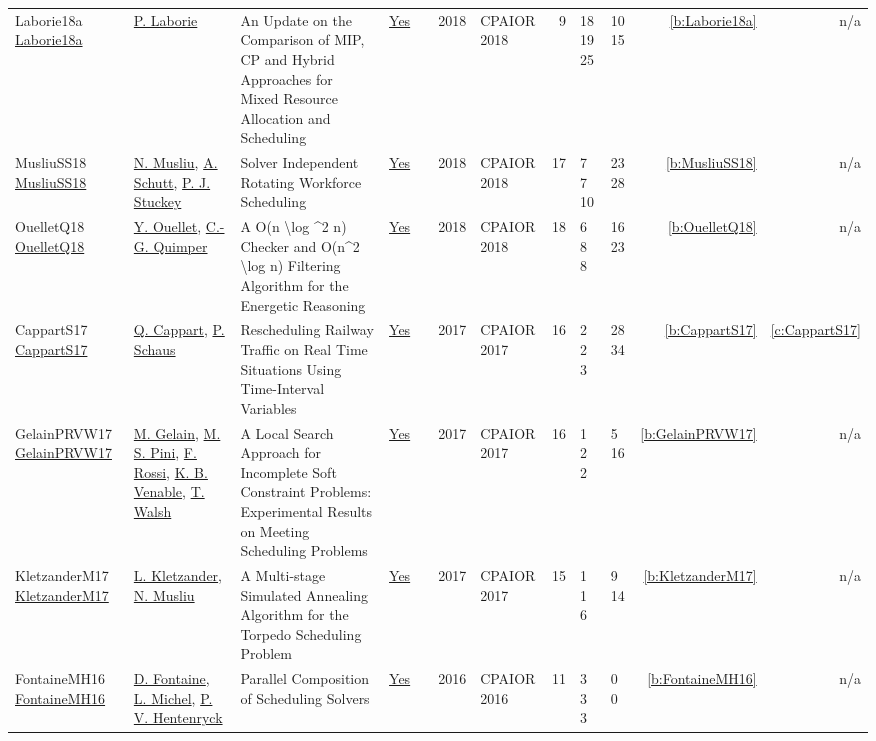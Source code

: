 {\begin{longtable}{>{\raggedright\arraybackslash}p{3cm}>{\raggedright\arraybackslash}p{4.5cm}>{\raggedright\arraybackslash}p{6.0cm}rrrp{2.5cm}rp{1cm}p{1cm}rr}
Laborie18a \href{https://doi.org/10.1007/978-3-319-93031-2_29}{Laborie18a} & \hyperref[auth:a118]{P. Laborie} & An Update on the Comparison of MIP, {CP} and Hybrid Approaches for Mixed Resource Allocation and Scheduling & \href{../works/Laborie18a.pdf}{Yes} & \cite{Laborie18a} & 2018 & CPAIOR 2018 & 9 & 18 19 25 & 10 15 & \ref{b:Laborie18a} & n/a\\
MusliuSS18 \href{https://doi.org/10.1007/978-3-319-93031-2_31}{MusliuSS18} & \hyperref[auth:a45]{N. Musliu}, \hyperref[auth:a124]{A. Schutt}, \hyperref[auth:a125]{P. J. Stuckey} & Solver Independent Rotating Workforce Scheduling & \href{../works/MusliuSS18.pdf}{Yes} & \cite{MusliuSS18} & 2018 & CPAIOR 2018 & 17 & 7 7 10 & 23 28 & \ref{b:MusliuSS18} & n/a\\
OuelletQ18 \href{https://doi.org/10.1007/978-3-319-93031-2_34}{OuelletQ18} & \hyperref[auth:a52]{Y. Ouellet}, \hyperref[auth:a37]{C.-G. Quimper} & A O(n {\textbackslash}log {\^{}}2 n) Checker and O(n{\^{}}2 {\textbackslash}log n) Filtering Algorithm for the Energetic Reasoning & \href{../works/OuelletQ18.pdf}{Yes} & \cite{OuelletQ18} & 2018 & CPAIOR 2018 & 18 & 6 8 8 & 16 23 & \ref{b:OuelletQ18} & n/a\\
CappartS17 \href{https://doi.org/10.1007/978-3-319-59776-8_26}{CappartS17} & \hyperref[auth:a42]{Q. Cappart}, \hyperref[auth:a147]{P. Schaus} & Rescheduling Railway Traffic on Real Time Situations Using Time-Interval Variables & \href{../works/CappartS17.pdf}{Yes} & \cite{CappartS17} & 2017 & CPAIOR 2017 & 16 & 2 2 3 & 28 34 & \ref{b:CappartS17} & \ref{c:CappartS17}\\
GelainPRVW17 \href{https://doi.org/10.1007/978-3-319-59776-8_32}{GelainPRVW17} & \hyperref[auth:a314]{M. Gelain}, \hyperref[auth:a315]{M. S. Pini}, \hyperref[auth:a316]{F. Rossi}, \hyperref[auth:a317]{K. B. Venable}, \hyperref[auth:a276]{T. Walsh} & A Local Search Approach for Incomplete Soft Constraint Problems: Experimental Results on Meeting Scheduling Problems & \href{../works/GelainPRVW17.pdf}{Yes} & \cite{GelainPRVW17} & 2017 & CPAIOR 2017 & 16 & 1 2 2 & 5 16 & \ref{b:GelainPRVW17} & n/a\\
KletzanderM17 \href{https://doi.org/10.1007/978-3-319-59776-8_28}{KletzanderM17} & \hyperref[auth:a78]{L. Kletzander}, \hyperref[auth:a45]{N. Musliu} & A Multi-stage Simulated Annealing Algorithm for the Torpedo Scheduling Problem & \href{../works/KletzanderM17.pdf}{Yes} & \cite{KletzanderM17} & 2017 & CPAIOR 2017 & 15 & 1 1 6 & 9 14 & \ref{b:KletzanderM17} & n/a\\
FontaineMH16 \href{https://doi.org/10.1007/978-3-319-33954-2_12}{FontaineMH16} & \hyperref[auth:a318]{D. Fontaine}, \hyperref[auth:a32]{L. Michel}, \hyperref[auth:a148]{P. V. Hentenryck} & Parallel Composition of Scheduling Solvers & \href{../works/FontaineMH16.pdf}{Yes} & \cite{FontaineMH16} & 2016 & CPAIOR 2016 & 11 & 3 3 3 & 0 0 & \ref{b:FontaineMH16} & n/a\\

\end{longtable}}
